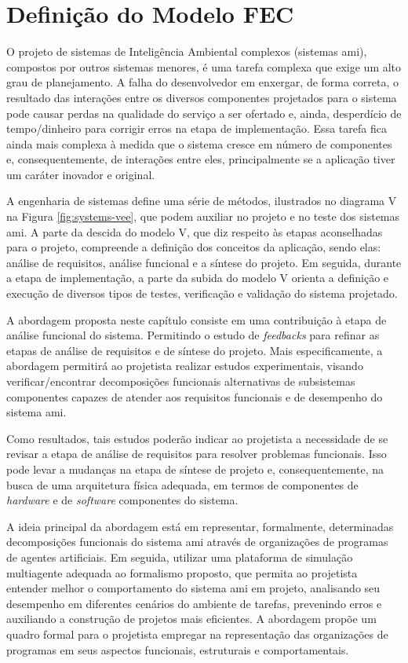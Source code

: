 \chapter{Definição do Modelo FEC} %
\label{cap:abordagem}

    O projeto de sistemas de Inteligência Ambiental complexos (sistemas \acrshort{ami}), compostos por outros sistemas menores, é uma tarefa complexa que exige um alto grau de planejamento. A falha do desenvolvedor em enxergar, de forma correta, o resultado das interações entre os diversos componentes projetados para o sistema pode causar perdas na qualidade do serviço a ser ofertado e, ainda, desperdício de tempo/dinheiro para corrigir erros na etapa de implementação. Essa tarefa fica ainda mais complexa à medida que o sistema cresce em número de componentes e, consequentemente, de interações entre eles, principalmente se a aplicação tiver um caráter inovador e original.

    A engenharia de sistemas define uma série de métodos, ilustrados no diagrama V na Figura \ref{fig:systems-vee}, que podem auxiliar no projeto e no teste dos sistemas \acrshort{ami}. A parte da descida do modelo V, que diz respeito às etapas aconselhadas para o projeto, compreende a definição dos conceitos da aplicação, sendo elas: análise de requisitos, análise funcional e a síntese do projeto. Em seguida, durante a etapa de implementação, a parte da subida do modelo V orienta a definição e execução de diversos tipos de testes, verificação e validação do sistema projetado. 

    A abordagem proposta neste capítulo consiste em uma contribuição à etapa de análise funcional do sistema. Permitindo o estudo de \textit{feedbacks} para refinar as etapas de análise de requisitos e de síntese do projeto. Mais especificamente, a abordagem permitirá ao projetista realizar estudos experimentais, visando verificar/encontrar decomposições funcionais alternativas de subsistemas componentes capazes de atender aos requisitos funcionais e de desempenho do sistema \acrshort{ami}. 
    
    Como resultados, tais estudos poderão indicar ao projetista a necessidade de se revisar a etapa de análise de requisitos para resolver problemas funcionais. Isso pode levar a mudanças na etapa de síntese de projeto e, consequentemente, na busca de uma arquitetura física adequada, em termos de componentes de \textit{hardware} e de \textit{software} componentes do sistema. 
    
    A ideia principal da abordagem está em representar, formalmente, determinadas decomposições funcionais do sistema \acrshort{ami} através de organizações de programas de agentes artificiais. Em seguida, utilizar uma plataforma de simulação multiagente adequada ao formalismo proposto, que permita ao projetista entender melhor o comportamento do sistema \acrshort{ami} em projeto, analisando seu desempenho em diferentes cenários do ambiente de tarefas, prevenindo erros e auxiliando a construção de projetos mais eficientes. A abordagem propõe um quadro formal para o projetista empregar na representação das organizações de programas em seus aspectos funcionais, estruturais e comportamentais.
    
